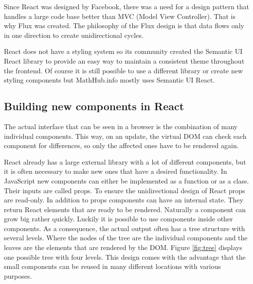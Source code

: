 \documentclass[11pt,a4paper]{article}
\begin{document}
Since React was designed by Facebook, there was a need for a design pattern that handles a large code base better than MVC (Model View Controller).
That is why Flux was created.
The philosophy of the Flux design is that data flows only in one direction to create unidirectional cycles. \cite{flux}

React does not have a styling system so its community created the Semantic UI React library to provide an easy way to maintain a consistent theme throughout the frontend.
Of course it is still possible to use a different library or create new styling components but MathHub.info mostly uses Semantic UI React.

\subsection{Building new components in React} \label{components}
The actual interface that can be seen in a browser is the combination of many individual components.
This way, on an update, the virtual DOM can check each component for differences, so only the affected ones have to be rendered again.

React already has a large external library with a lot of different components, but it is often necessary to make new ones that have a desired functionality.
In JavaScript new components can either be implemented as a function or as a class.
Their inputs are called props.
To ensure the unidirectional design of React props are read-only.
In addition to props components can have an internal state.
They return React elements that are ready to be rendered.
Naturally a component can grow big rather quickly.
Luckily it is possible to use components inside other components.
As a consequence, the actual output often has a tree structure with several levels.
Where the nodes of the tree are the individual components and the leaves are the elements that are rendered by the DOM.
Figure \ref{fig:tree} displays one possible tree with four levels.
This design comes with the advantage that the small components can be reused in many different locations with various purposes.
\end{document}
